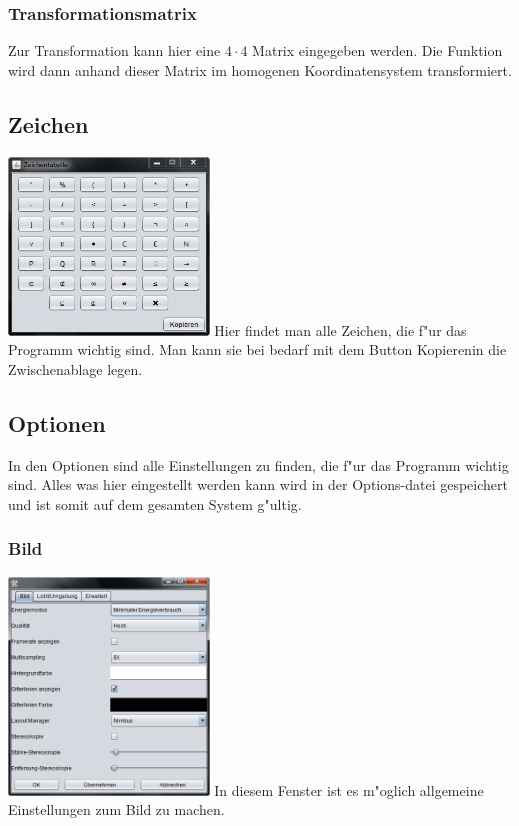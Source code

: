 \documentclass{scrartcl}
\begin{document}
\subsubsection{Transformationsmatrix}
Zur Transformation kann hier eine \(4 \cdot 4\) Matrix eingegeben werden. Die Funktion wird dann anhand dieser Matrix im homogenen Koordinatensystem transformiert.
\subsection{Zeichen}
\label{chp:Zeichen_Fenster}
\includegraphics[width=0.4\textwidth]{images/program/characters-window.png}\newline
Hier findet man alle Zeichen, die f"ur das Programm wichtig sind. Man kann sie bei bedarf mit dem Button \glqq Kopieren\grqq in die Zwischenablage legen.
\subsection{Optionen}
In den Optionen sind alle Einstellungen zu finden, die f"ur das Programm wichtig sind. Alles was hier eingestellt werden kann wird in der Options-datei gespeichert und ist somit auf dem gesamten System g"ultig.
\subsubsection{Bild}
\includegraphics[width=0.4\textwidth]{images/program/settings0-window.png}\newline
In diesem Fenster ist es m"oglich allgemeine Einstellungen zum Bild zu machen.
\end{document}
